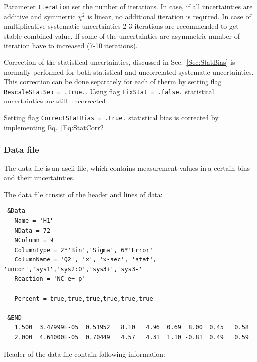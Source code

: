 Parameter {\tt Iteration} set the number of iterations. In case, if all uncertainties are additive and symmetric $\chi^2$ is linear, no additional iteration is required. In case of multiplicative systematic uncertainties 2-3 iterations are recommended to get stable combined value. If some of the uncertainties are asymmetric number of iteration have to increased (7-10 iterations).

Correction of the statistical uncertainties, discussed in Sec.~\ref{Sec:StatBias} is normally performed for both statistical and uncorrelated systematic uncertainties. This correction can be done separately for each of therm by setting flag {\tt RescaleStatSep = .true.}. Using flag {\tt FixStat = .false.} statistical uncertainties are still uncorrected.

Setting flag {\tt CorrectStatBias = .true.} statistical bias is corrected by implementing Eq.~\ref{Eq:StatCorr2}


\subsubsection{Data file}
\label{Sec:Data}

The data-file is an ascii-file, which contains measurement values in a certain bins and their uncertainties. 

The data file consist of the header and lines of data:
\begin{verbatim}
 &Data
   Name = 'H1' 
   NData = 72
   NColumn = 9
   ColumnType = 2*'Bin','Sigma', 6*'Error' 
   ColumnName = 'Q2', 'x', 'x-sec', 'stat', 'uncor','sys1','sys2:O','sys3+','sys3-'
   Reaction = 'NC e+-p' 
                                                     
   Percent = true,true,true,true,true,true
                                                     
 &END
   1.500  3.47999E-05  0.51952   8.10   4.96  0.69  8.00  0.45   0.58   
   2.000  4.64000E-05  0.70449   4.57   4.31  1.10 -0.81  0.49   0.59
\end{verbatim}

Header of the data file contain following information:

